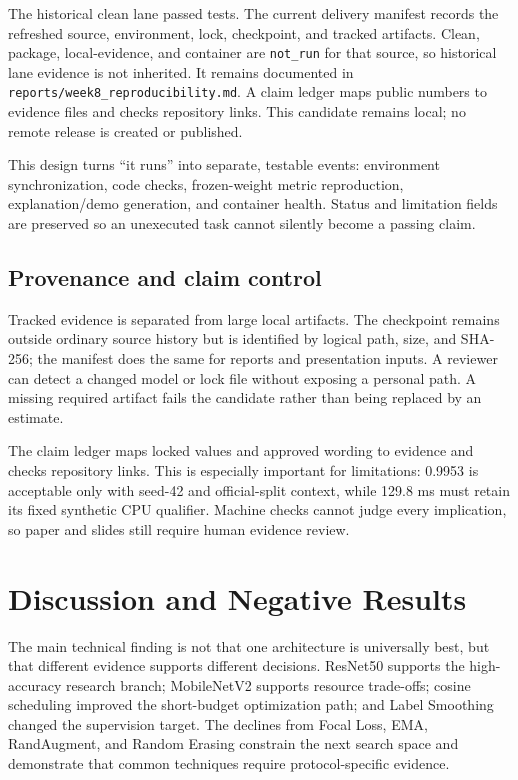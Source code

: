 \documentclass[11pt]{article}
\begin{document}
The historical clean lane passed \PDAWeekEightCleanTests{} tests. The current delivery manifest records the refreshed source, environment, lock, checkpoint, and tracked artifacts. Clean, package, local-evidence, and container are \texttt{not\_run} for that source, so historical lane evidence is not inherited. It remains documented in \texttt{reports/week8\_reproducibility.md}. A claim ledger maps public numbers to evidence files and checks repository links. This candidate remains local; no remote release is created or published.

This design turns ``it runs'' into separate, testable events: environment synchronization, code checks, frozen-weight metric reproduction, explanation/demo generation, and container health. Status and limitation fields are preserved so an unexecuted task cannot silently become a passing claim.

\subsection*{Provenance and claim control}

Tracked evidence is separated from large local artifacts. The checkpoint remains outside ordinary source history but is identified by logical path, size, and SHA-256; the manifest does the same for reports and presentation inputs. A reviewer can detect a changed model or lock file without exposing a personal path. A missing required artifact fails the candidate rather than being replaced by an estimate.

The claim ledger maps locked values and approved wording to evidence and checks repository links. This is especially important for limitations: 0.9953 is acceptable only with seed-42 and official-split context, while 129.8 ms must retain its fixed synthetic CPU qualifier. Machine checks cannot judge every implication, so paper and slides still require human evidence review.

\section{Discussion and Negative Results}

The main technical finding is not that one architecture is universally best, but that different evidence supports different decisions. ResNet50 supports the high-accuracy research branch; MobileNetV2 supports resource trade-offs; cosine scheduling improved the short-budget optimization path; and Label Smoothing changed the supervision target. The declines from Focal Loss, EMA, RandAugment, and Random Erasing constrain the next search space and demonstrate that common techniques require protocol-specific evidence.
\end{document}
